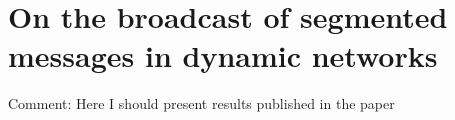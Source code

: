 \section{On the broadcast of segmented messages in dynamic networks}
Comment: Here I should present results published in the paper
